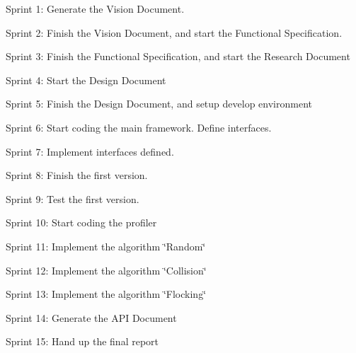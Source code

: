 \begin{DoxyItemize}
\item Sprint 1\+: Generate the Vision Document.
\item Sprint 2\+: Finish the Vision Document, and start the Functional Specification.
\item Sprint 3\+: Finish the Functional Specification, and start the Research Document
\item Sprint 4\+: Start the Design Document
\item Sprint 5\+: Finish the Design Document, and setup develop environment
\item Sprint 6\+: Start coding the main framework. Define interfaces.
\item Sprint 7\+: Implement interfaces defined.
\item Sprint 8\+: Finish the first version.
\item Sprint 9\+: Test the first version.
\item Sprint 10\+: Start coding the profiler
\item Sprint 11\+: Implement the algorithm \char`\"{}\+Random\char`\"{}
\item Sprint 12\+: Implement the algorithm \char`\"{}\+Collision\char`\"{}
\item Sprint 13\+: Implement the algorithm \char`\"{}\+Flocking\char`\"{}
\item Sprint 14\+: Generate the A\+P\+I Document
\item Sprint 15\+: Hand up the final report 
\end{DoxyItemize}